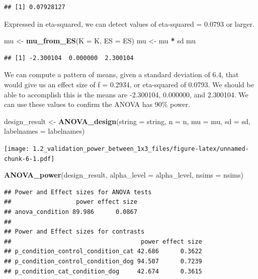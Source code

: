 \documentclass[]{article}
\newenvironment{Shaded}{\begin{snugshade}}{\end{snugshade}}
\newcommand{\KeywordTok}[1]{\textcolor[rgb]{0.13,0.29,0.53}{\textbf{#1}}}
\newcommand{\DataTypeTok}[1]{\textcolor[rgb]{0.13,0.29,0.53}{#1}}
\newcommand{\StringTok}[1]{\textcolor[rgb]{0.31,0.60,0.02}{#1}}
\newcommand{\OperatorTok}[1]{\textcolor[rgb]{0.81,0.36,0.00}{\textbf{#1}}}
\newcommand{\NormalTok}[1]{#1}
\begin{document}
\begin{verbatim}
## [1] 0.07928127
\end{verbatim}

Expressed in eta-squared, we can detect values of eta-squared = 0.0793
or larger.

\begin{Shaded}
\begin{Highlighting}[]
\NormalTok{mu <-}\StringTok{ }\KeywordTok{mu_from_ES}\NormalTok{(}\DataTypeTok{K =}\NormalTok{ K, }\DataTypeTok{ES =}\NormalTok{ ES)}
\NormalTok{mu <-}\StringTok{ }\NormalTok{mu }\OperatorTok{*}\StringTok{ }\NormalTok{sd}
\NormalTok{mu}
\end{Highlighting}
\end{Shaded}

\begin{verbatim}
## [1] -2.300104  0.000000  2.300104
\end{verbatim}

We can compute a pattern of means, given a standard deviation of 6.4,
that would give us an effect size of f = 0.2934, or eta-squared of
0.0793. We should be able to accomplish this is the means are -2.300104,
0.000000, and 2.300104. We can use these values to confirm the ANOVA has
90\% power.

\begin{Shaded}
\begin{Highlighting}[]
\NormalTok{design_result <-}\StringTok{ }\KeywordTok{ANOVA_design}\NormalTok{(}\DataTypeTok{string =}\NormalTok{ string,}
                   \DataTypeTok{n =}\NormalTok{ n, }
                   \DataTypeTok{mu =}\NormalTok{ mu, }
                   \DataTypeTok{sd =}\NormalTok{ sd, }
                   \DataTypeTok{labelnames =}\NormalTok{ labelnames)}
\end{Highlighting}
\end{Shaded}

\texttt{[image: 1.2\_validation\_power\_between\_1x3\_files/figure-latex/unnamed-chunk-6-1.pdf]}

\begin{Shaded}
\begin{Highlighting}[]
\KeywordTok{ANOVA_power}\NormalTok{(design_result, }\DataTypeTok{alpha_level =}\NormalTok{ alpha_level, }\DataTypeTok{nsims =}\NormalTok{ nsims)}
\end{Highlighting}
\end{Shaded}

\begin{verbatim}
## Power and Effect sizes for ANOVA tests
##                  power effect size
## anova_condition 89.986      0.0867
## 
## Power and Effect sizes for contrasts
##                                    power effect size
## p_condition_control_condition_cat 42.686      0.3622
## p_condition_control_condition_dog 94.507      0.7239
## p_condition_cat_condition_dog     42.674      0.3615
\end{verbatim}
\end{document}
